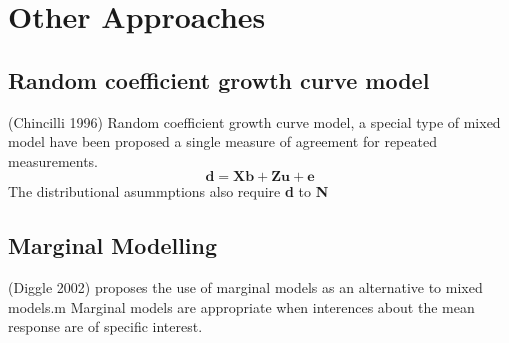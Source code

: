 \documentclass[12pt, a4paper]{report}
\theoremstyle{plain}
\theoremstyle{definition}
\theoremstyle{remark}
\begin{document}
\section{Other Approaches}

\subsection{Random coefficient growth curve model} (Chincilli
1996) Random coefficient growth curve model, a special type of
mixed model have been proposed a single measure of agreement for
repeated measurements.
\begin{equation}
\textbf{d}= \textbf{Xb} + \textbf{Zu} + \textbf{e}
\end{equation}
The distributional asummptions also require \textbf{d} to
\textbf{N}

\subsection{Marginal Modelling}
(Diggle 2002) proposes the use of marginal models as an
alternative to mixed models.m Marginal models are appropriate when
interences about the mean response are of specific interest.



\bigskip
{}



\end{document}
